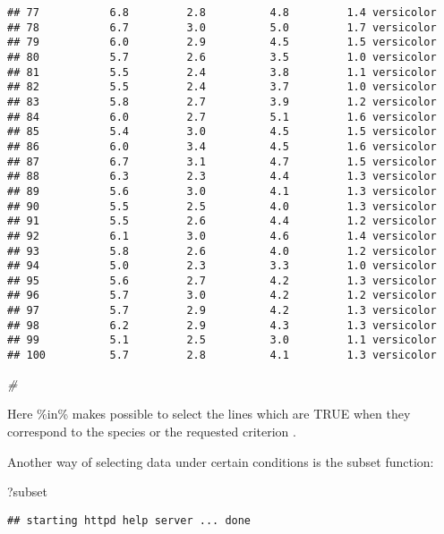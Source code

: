 \documentclass[
]{article}
\newenvironment{Shaded}{\begin{snugshade}}{\end{snugshade}}
\newcommand{\CommentTok}[1]{\textcolor[rgb]{0.56,0.35,0.01}{\textit{#1}}}
\newcommand{\NormalTok}[1]{#1}
\begin{document}
\begin{verbatim}
## 77           6.8         2.8          4.8         1.4 versicolor
## 78           6.7         3.0          5.0         1.7 versicolor
## 79           6.0         2.9          4.5         1.5 versicolor
## 80           5.7         2.6          3.5         1.0 versicolor
## 81           5.5         2.4          3.8         1.1 versicolor
## 82           5.5         2.4          3.7         1.0 versicolor
## 83           5.8         2.7          3.9         1.2 versicolor
## 84           6.0         2.7          5.1         1.6 versicolor
## 85           5.4         3.0          4.5         1.5 versicolor
## 86           6.0         3.4          4.5         1.6 versicolor
## 87           6.7         3.1          4.7         1.5 versicolor
## 88           6.3         2.3          4.4         1.3 versicolor
## 89           5.6         3.0          4.1         1.3 versicolor
## 90           5.5         2.5          4.0         1.3 versicolor
## 91           5.5         2.6          4.4         1.2 versicolor
## 92           6.1         3.0          4.6         1.4 versicolor
## 93           5.8         2.6          4.0         1.2 versicolor
## 94           5.0         2.3          3.3         1.0 versicolor
## 95           5.6         2.7          4.2         1.3 versicolor
## 96           5.7         3.0          4.2         1.2 versicolor
## 97           5.7         2.9          4.2         1.3 versicolor
## 98           6.2         2.9          4.3         1.3 versicolor
## 99           5.1         2.5          3.0         1.1 versicolor
## 100          5.7         2.8          4.1         1.3 versicolor
\end{verbatim}

\begin{Shaded}
\begin{Highlighting}[]
\CommentTok{\#}
\end{Highlighting}
\end{Shaded}

Here \%in\% makes possible to select the lines which are TRUE when they
correspond to the species or the requested criterion .

Another way of selecting data under certain conditions is the subset
function:

\begin{Shaded}
\begin{Highlighting}[]
\NormalTok{?subset}
\end{Highlighting}
\end{Shaded}

\begin{verbatim}
## starting httpd help server ... done
\end{verbatim}
\end{document}
